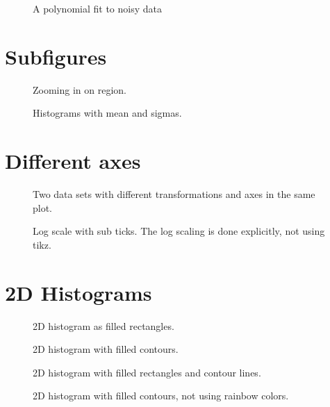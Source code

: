 \documentclass{article}
\begin{document}
\begin{figure}[H]
  \centering
  
  \caption{A polynomial fit to noisy data}
\end{figure}

\section{Subfigures}
\label{sec:subfig}

\begin{figure}[H]
  \centering
  
  \caption{ Zooming in on region. }
\end{figure}

\begin{figure}[H]
  \centering
  
  \caption{ Histograms with mean and sigmas.}
\end{figure}

\section{Different axes}
\label{sec:axis}

\begin{figure}[H]
  \centering
  
  \caption{ Two data sets with different transformations and axes in the same plot.}
\end{figure}

\begin{figure}[H]
  \centering
  
  \caption{ Log scale with sub ticks. The log scaling is done explicitly, not using tikz.}
\end{figure}

\section{2D Histograms}
\label{sec:2dhisto}

\begin{figure}[H]
  \centering
  
  \caption{ 2D histogram as filled rectangles.}
\end{figure}

\begin{figure}[H]
  \centering
  
  \caption{ 2D histogram with filled contours.}
\end{figure}

\begin{figure}[H]
  \centering
  
  \caption{ 2D histogram  with filled rectangles and contour lines.}
\end{figure}

\begin{figure}[H]
  \centering
  
  \caption{ 2D histogram with filled contours, not using rainbow colors.}
\end{figure}
\end{document}
